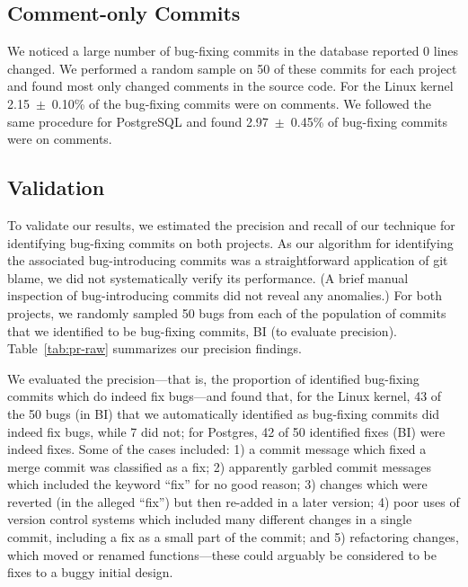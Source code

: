 \subsection{Comment-only Commits}
We noticed a large number of bug-fixing commits in the database
reported 0 lines changed. We performed a random sample on 50 of these
commits for each project and found most only changed comments in the
source code. For the Linux kernel 2.15~$\pm$~0.10\% of the bug-fixing
commits were on comments. We followed the same procedure for
PostgreSQL and found 2.97~$\pm$~0.45\% of bug-fixing commits were on
comments.


\subsection{Validation} 
To validate our results, we estimated the precision and recall of our
technique for identifying bug-fixing commits on both projects.  As our
algorithm for identifying the associated bug-introducing commits was a
straightforward application of git blame, we did not systematically
verify its performance. (A brief manual inspection of bug-introducing
commits did not reveal any anomalies.) 
For both projects, we randomly sampled 50 bugs
from each of the population of commits that we identified to be
bug-fixing commits, BI (to evaluate precision).
Table~\ref{tab:pr-raw} summarizes our precision findings.

We evaluated the precision---that is, the proportion of identified
bug-fixing commits which do indeed fix bugs---and found that, for
the Linux kernel, 43 of the 50 bugs (in BI) that we automatically identified as
bug-fixing commits did indeed fix bugs, while 7 did not; for Postgres,
42 of 50 identified fixes (BI) were indeed fixes.  Some of the
cases included: 1) a commit message which fixed a merge commit was
classified as a fix; 2) apparently garbled commit messages which
included the keyword ``fix'' for no good reason; 3) changes which were
reverted (in the alleged ``fix'') but then re-added in a later
version; 4) poor uses of version control systems which included many
different changes in a single commit, including a fix as a small part 
of the commit; and 5) refactoring changes, which moved or renamed
functions---these could arguably be considered to be fixes to a buggy
initial design.

